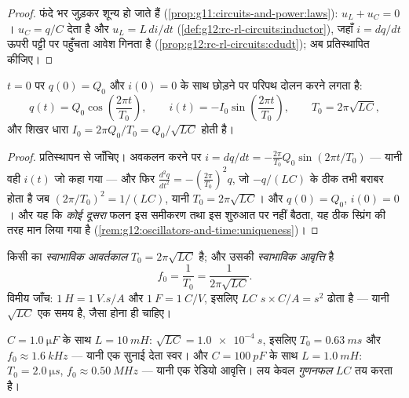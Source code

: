 \begin{proof}
फंदे भर  जुड़कर शून्य हो जाते हैं (\cref{prop:g11:circuits-and-power:laws}): $u_L + u_C = 0$।
 $u_C = q/C$ देता है और  $u_L = L\,di/dt$ (\cref{def:g12:rc-rl-circuits:inductor}), जहाँ
$i = dq/dt$ ऊपरी पट्टी पर पहुँचता आवेश गिनता है (\cref{prop:g12:rc-rl-circuits:cdudt}); अब प्रतिस्थापित कीजिए।
\end{proof}

\begin{theorem}[LC परिपथ के मुक्त दोलन]\label{thm:g12:rlc-oscillations:oscillation}
$t = 0$ पर $q(0) = Q_0$ और $i(0) = 0$ के साथ छोड़ने पर परिपथ दोलन करने लगता है:
\[
q(t) = Q_0 \cos\!\left(\frac{2\pi t}{T_0}\right),
\qquad
i(t) = -I_0 \sin\!\left(\frac{2\pi t}{T_0}\right),
\qquad
T_0 = 2\pi\sqrt{LC},
\]
और शिखर धारा $I_0 = 2\pi Q_0/T_0 = Q_0/\sqrt{LC}$ होती है।
\end{theorem}

\begin{proof}
प्रतिस्थापन से जाँचिए। अवकलन करने पर $i = dq/dt = -\frac{2\pi}{T_0} Q_0 \sin(2\pi t/T_0)$ --- यानी वही $i(t)$ जो कहा गया
--- और फिर $\frac{d^2q}{dt^2} = -(\frac{2\pi}{T_0})^2 q$, जो $-q/(LC)$ के ठीक तभी बराबर होता है जब $(2\pi/T_0)^2 = 1/(LC)$, यानी
$T_0 = 2\pi\sqrt{LC}$। और $q(0) = Q_0$, $i(0) = 0$। और यह कि \emph{कोई दूसरा} फलन इस समीकरण तथा इस
शुरुआत पर नहीं बैठता, यह ठीक स्प्रिंग की तरह मान लिया गया है (\cref{rem:g12:oscillators-and-time:uniqueness})।
\end{proof}

\begin{definition}[स्वाभाविक आवर्तकाल और आवृत्ति]\label{def:g12:rlc-oscillations:period}
किसी  का \emph{स्वाभाविक आवर्तकाल} $T_0 = 2\pi\sqrt{LC}$ है; और उसकी \emph{स्वाभाविक
आवृत्ति} है
\[
f_0 = \frac{1}{T_0} = \frac{1}{2\pi\sqrt{LC}} .
\]
विमीय जाँच: $\qty{1}{H} = \qty{1}{V.s/A}$ और $\qty{1}{F} = \qty{1}{C/V}$, इसलिए $LC$ $\unit{s} \times \unit{C/A} = \unit{s^2}$ ढोता है --- यानी $\sqrt{LC}$
एक समय है, जैसा होना ही चाहिए।
\end{definition}

\begin{example}[पहली संख्याएँ]\label{ex:g12:rlc-oscillations:firstnumbers}
$C = \qty{1.0}{\micro F}$ के साथ $L = \qty{10}{mH}$: $\sqrt{LC} = \qty{1.0e-4}{s}$, इसलिए $T_0 = \qty{0.63}{ms}$ और $f_0 \approx \qty{1.6}{kHz}$ --- यानी एक सुनाई देता
स्वर। और $C = \qty{100}{pF}$ के साथ $L = \qty{1.0}{mH}$: $T_0 = \qty{2.0}{\micro s}$, $f_0 \approx \qty{0.50}{MHz}$ --- यानी एक रेडियो
आवृत्ति। लय केवल \emph{गुणनफल} $LC$ तय करता है।
\end{example}


